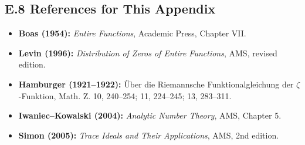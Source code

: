 \subsection*{E.8 References for This Appendix}

\begin{itemize}
\item \textbf{Boas (1954):} \emph{Entire Functions}, Academic Press, Chapter VII.
\item \textbf{Levin (1996):} \emph{Distribution of Zeros of Entire Functions}, AMS, revised edition.
\item \textbf{Hamburger (1921–1922):} Über die Riemannsche Funktionalgleichung der $\zeta$-Funktion, Math. Z. 10, 240–254; 11, 224–245; 13, 283–311.
\item \textbf{Iwaniec–Kowalski (2004):} \emph{Analytic Number Theory}, AMS, Chapter 5.
\item \textbf{Simon (2005):} \emph{Trace Ideals and Their Applications}, AMS, 2nd edition.
\end{itemize}
